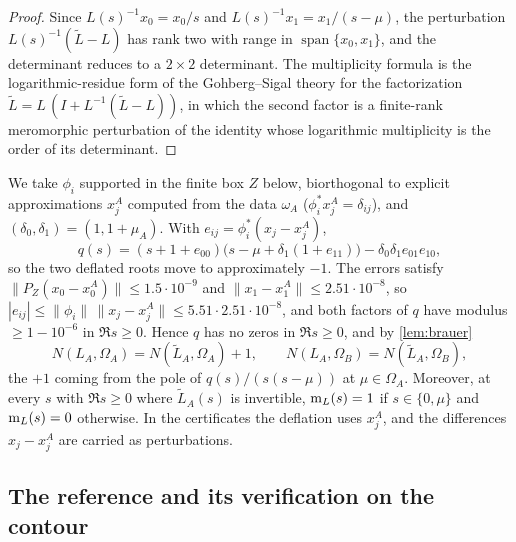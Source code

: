 \begin{proof}
Since $L(s)^{-1}x_0=x_0/s$ and $L(s)^{-1}x_1=x_1/(s-\mu)$, the perturbation $L(s)^{-1}(\widetilde L-L)$ has
rank two with range in $\operatorname{span}\{x_0,x_1\}$, and the determinant reduces to a $2\times2$
determinant. The multiplicity formula is the logarithmic-residue form of the Gohberg--Sigal theory for the
factorization $\widetilde L=L\,(I+L^{-1}(\widetilde L-L))$, in which the second factor is a finite-rank
meromorphic perturbation of the identity whose logarithmic multiplicity is the order of its determinant.
\end{proof}

We take $\phi_i$ supported in the finite box $Z$ below, biorthogonal to explicit approximations $x_j^A$ computed
from the data $\omega_A$ ($\phi_i^*x_j^A=\delta_{ij}$), and $(\delta_0,\delta_1)=(1,1+\mu_A)$. With
$e_{ij}=\phi_i^*(x_j-x_j^A)$,
\[
  q(s)=(s+1+e_{00})\big(s-\mu+\delta_1(1+e_{11})\big)-\delta_0\delta_1e_{01}e_{10},
\]
so the two deflated roots move to approximately $-1$. The errors satisfy $\|P_Z(x_0-x_0^A)\|\le1.5\cdot10^{-9}$
and $\|x_1-x_1^A\|\le2.51\cdot10^{-8}$, so $|e_{ij}|\le\|\phi_i\|\,\|x_j-x_j^A\|\le5.51\cdot2.51\cdot10^{-8}$, and both factors of $q$ have modulus
$\ge1-10^{-6}$ in $\Re s\ge0$. Hence $q$ has no zeros in $\Re s\ge0$, and by \cref{lem:brauer}
\begin{equation}\label{eq:brauer-count}
  N(L_A,\Omega_A)=N(\widetilde L_A,\Omega_A)+1,\qquad N(L_A,\Omega_B)=N(\widetilde L_A,\Omega_B),
\end{equation}
the $+1$ coming from the pole of $q(s)/(s(s-\mu))$ at $\mu\in\Omega_A$. Moreover, at every $s$ with $\Re s\ge0$ where
$\widetilde L_A(s)$ is invertible, $\operatorname{m}_L(s)=1$ if $s\in\{0,\mu\}$ and $\operatorname{m}_L(s)=0$ otherwise. In the certificates the
deflation uses $x_j^A$, and the differences $x_j-x_j^A$ are carried as perturbations.

\subsection{The reference and its verification on the contour}\label{sec:counting-reference}

